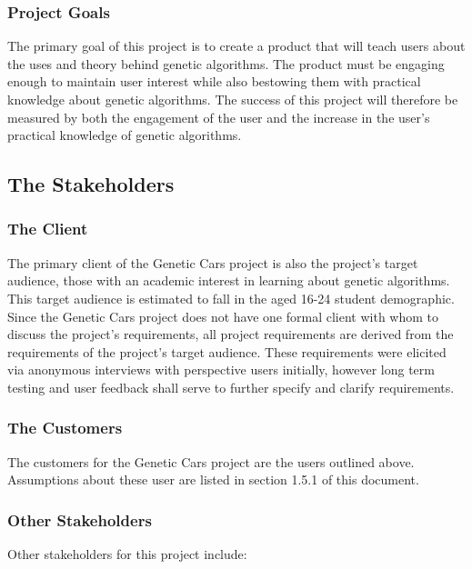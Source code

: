 \documentclass[12pt, titlepage]{article}
\begin{document}
\subsubsection{Project Goals}

The primary goal of this project is to create a product that will teach users about the uses and theory behind genetic algorithms. The product must be engaging enough to maintain user interest while also bestowing them with practical knowledge about genetic algorithms. The success of this project will therefore be measured by both the engagement of the user and the increase in the user's practical knowledge of genetic algorithms.

\subsection{The Stakeholders}

\subsubsection{The Client}

The primary client of the Genetic Cars project is also the project's target audience, those with an academic interest in learning about genetic algorithms. This target audience is estimated to fall in the aged 16-24 student demographic. Since the Genetic Cars project does not have one formal client with whom to discuss the project's requirements, all project requirements are derived from the requirements of the project's target audience. These requirements were elicited via anonymous interviews with perspective users initially, however long term testing and user feedback shall serve to further specify and clarify requirements.

\subsubsection{The Customers}

The customers for the Genetic Cars project are the users outlined above. Assumptions about these user are listed in section 1.5.1 of this document.

\subsubsection{Other Stakeholders}

Other stakeholders for this project include:\\
\end{document}

